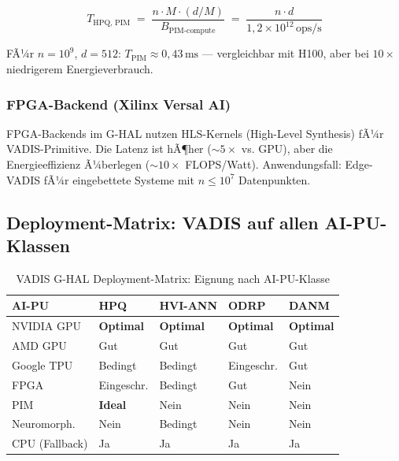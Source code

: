 ﻿\documentclass[12pt,a4paper]{article}
\begin{document}
\begin{equation}
  T_{\text{HPQ, PIM}} \;=\;
  \frac{n \cdot M \cdot (d/M)}{B_{\text{PIM-compute}}}
  \;=\; \frac{n \cdot d}{1{,}2 \times 10^{12}\,\text{ops/s}}
\end{equation}

FÃ¼r $n = 10^9$, $d = 512$: $T_{\text{PIM}} \approx 0{,}43\,\text{ms}$ ---
vergleichbar mit H100, aber bei $10\times$ niedrigerem Energieverbrauch.

\subsubsection{FPGA-Backend (Xilinx Versal AI)}

FPGA-Backends im G-HAL nutzen HLS-Kernels (High-Level Synthesis)
fÃ¼r VADIS-Primitive. Die Latenz ist hÃ¶her ($\sim 5\times$ vs. GPU),
aber die Energieeffizienz Ã¼berlegen ($\sim 10\times$ FLOPS/Watt).
Anwendungsfall: Edge-VADIS fÃ¼r eingebettete Systeme mit
$n \leq 10^7$ Datenpunkten.

\subsection{Deployment-Matrix: VADIS auf allen AI-PU-Klassen}
\label{sub:deployment_matrix}

\begin{table}[ht]
\centering
\small
\caption{VADIS G-HAL Deployment-Matrix: Eignung nach AI-PU-Klasse}
\label{tab:deployment}
\begin{tabular}{@{}p{1.8cm}p{1.5cm}p{1.5cm}p{1.5cm}p{1.5cm}@{}}
\toprule
\textbf{AI-PU} & \textbf{HPQ} & \textbf{HVI-ANN} & \textbf{ODRP} & \textbf{DANM} \\
\midrule
NVIDIA GPU & \textcolor{nvidiaGreen}{\textbf{Optimal}} & \textcolor{nvidiaGreen}{\textbf{Optimal}} & \textcolor{nvidiaGreen}{\textbf{Optimal}} & \textcolor{nvidiaGreen}{\textbf{Optimal}} \\
AMD GPU & Gut & Gut & Gut & Gut \\
Google TPU & Bedingt & Bedingt & Eingeschr. & Gut \\
FPGA & Eingeschr. & Bedingt & Gut & Nein \\
PIM & \textcolor{nvidiaGreen}{\textbf{Ideal}} & Nein & Nein & Nein \\
Neuromorph. & Nein & Bedingt & Nein & Nein \\
CPU (Fallback) & Ja & Ja & Ja & Ja \\
\bottomrule
\end{tabular}
\end{table}
\end{document}
